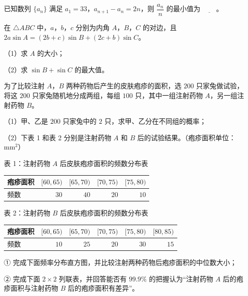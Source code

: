 \endgroup
\begin{question}
已知数列 $\{a_n\}$ 满足 $a_1=33$，$a_{n+1}-a_n=2n$，则 $\dfrac{a_n}{n}$ 的最小值为 $\underline{\qquad}$。

\end{question}
\begin{question}
在 $\triangle ABC$ 中，$a$，$b$，$c$ 分别为内角 $A$，$B$，$C$ 的对边，且 $2a\sin A=(2b+c)\sin B+(2c+b)\sin C$。

（1）求 $A$ 的大小；

（2）求 $\sin B+\sin C$ 的最大值。

\Needspace{0.4\textheight}
\end{question}
\begingroup
\renewenvironment{question}{\Needspace{0.5\textheight}}{}
\begin{question}
为了比较注射 $A$，$B$ 两种药物后产生的皮肤疱疹的面积，选 $200$ 只家兔做试验，将这 $200$ 只家兔随机地分成两组，每组 $100$ 只，其中一组注射药物 $A$，另一组注射药物 $B$。

（1）甲、乙是 $200$ 只家兔中的 $2$ 只，求甲、乙分在不同组的概率；

（2）下表 1 和表 2 分别是注射药物 $A$ 和 $B$ 后的试验结果。（疱疹面积单位：$\mathrm{mm}^2$）

表 1：注射药物 $A$ 后皮肤疱疹面积的频数分布表

\begin{center}
\begin{tabular}{lrrrr}
\toprule
疱疹面积 & $[60,65)$ & $[65,70)$ & $[70,75)$ & $[75,80)$ \\
\midrule
频数 & $30$ & $40$ & $20$ & $10$ \\
\bottomrule
\end{tabular}
\end{center}

表 2：注射药物 $B$ 后皮肤疱疹面积的频数分布表

\begin{center}
\begin{tabular}{lrrrrr}
\toprule
疱疹面积 & $[60,65)$ & $[65,70)$ & $[70,75)$ & $[75,80)$ & $[80,85)$ \\
\midrule
频数 & $10$ & $25$ & $20$ & $30$ & $15$ \\
\bottomrule
\end{tabular}
\end{center}

① 完成下面频率分布直方图，并比较注射两种药物后疱疹面积的中位数大小；
\nopagebreak[4]
\begin{center}\end{center}
\nopagebreak[4]
② 完成下面 $2\times2$ 列联表，并回答能否有 $99.9\%$ 的把握认为“注射药物 $A$ 后的疱疹面积与注射药物 $B$ 后的疱疹面积有差异”。


\end{question}
